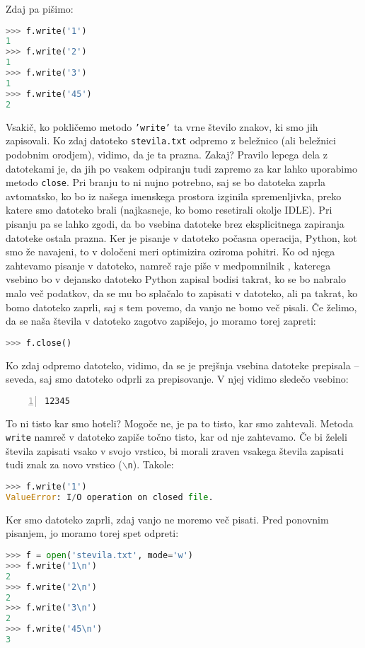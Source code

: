 Zdaj pa pišimo:
\begin{lstlisting}[language=Python, showstringspaces=false]
>>> f.write('1')
1
>>> f.write('2')
1
>>> f.write('3')
1
>>> f.write('45')
2
\end{lstlisting}
Vsakič, ko pokličemo metodo \texttt{'write'} ta vrne število znakov, ki smo jih zapisovali. Ko zdaj datoteko \texttt{stevila.txt} odpremo z beležnico (ali beležnici podobnim orodjem), vidimo, da je ta prazna. Zakaj? Pravilo lepega dela z datotekami je, da jih po vsakem odpiranju tudi zapremo za kar lahko uporabimo metodo \texttt{close}. Pri branju to ni nujno potrebno, saj se bo datoteka zaprla avtomatsko, ko bo iz našega imenskega prostora izginila spremenljivka, preko katere smo datoteko brali (najkasneje, ko bomo resetirali okolje IDLE). Pri pisanju pa se lahko zgodi, da bo vsebina datoteke brez eksplicitnega zapiranja datoteke ostala prazna. Ker je pisanje v datoteko počasna operacija, Python, kot smo že navajeni, to v določeni meri optimizira oziroma pohitri. Ko od njega zahtevamo pisanje v datoteko, namreč raje piše v medpomnilnik , katerega vsebino bo v dejansko datoteko Python zapisal bodisi takrat, ko se bo nabralo malo več podatkov, da se mu bo splačalo to zapisati v datoteko, ali pa takrat, ko bomo datoteko zaprli, saj s tem povemo, da vanjo ne bomo več pisali. Če želimo, da se naša števila v datoteko zagotvo zapišejo, jo moramo torej zapreti:
\begin{lstlisting}[language=Python, showstringspaces=false]
>>> f.close()
\end{lstlisting}
Ko zdaj odpremo datoteko, vidimo, da se je prejšnja vsebina datoteke prepisala -- seveda, saj smo datoteko odprli za prepisovanje. V njej vidimo sledečo vsebino:
\begin{lstlisting}[showstringspaces=false,numbers=left]
12345
\end{lstlisting}
To ni tisto kar smo hoteli? Mogoče ne, je pa to tisto, kar smo zahtevali. Metoda \texttt{write} namreč v datoteko zapiše točno tisto, kar od nje zahtevamo. Če bi želeli števila zapisati vsako v svojo vrstico, bi morali zraven vsakega števila zapisati tudi znak za novo vrstico (\texttt{$\backslash$n}). Takole:
\begin{lstlisting}[language=Python, showstringspaces=false]
>>> f.write('1')
ValueError: I/O operation on closed file.
\end{lstlisting}
Ker smo datoteko zaprli, zdaj vanjo ne moremo več pisati. Pred ponovnim pisanjem, jo moramo torej spet odpreti:
\begin{lstlisting}[language=Python, showstringspaces=false]
>>> f = open('stevila.txt', mode='w')
>>> f.write('1\n')
2
>>> f.write('2\n')
2
>>> f.write('3\n')
2
>>> f.write('45\n')
3
\end{lstlisting}
